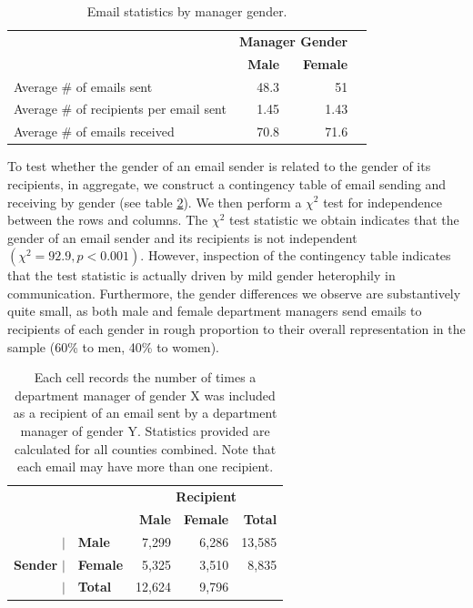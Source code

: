 \documentclass{pnastwo}
\begin{document}
\begin{article}
	\setlength{\tabcolsep}{2pt}
	\begin{table}
	\centering
		\begin{tabular}{m{2.1in}rrr}
		\toprule
		& \multicolumn{2}{c}{\textbf{Manager Gender}} \\
		\cmidrule{2-3}
	& \textbf{Male} & \textbf{Female}  \\
		 \midrule
		 Average \# of emails sent & 48.3 & 51 \\
		 Average \# of recipients per email sent & 1.45 & 1.43 \\
		 \midrule
		 Average \# of emails received & 70.8 & 71.6 \\
		\bottomrule
		\end{tabular}
		\caption{\label{tab:email agg stats}Email statistics by manager
gender.\\}
	\end{table}
	\setlength{\tabcolsep}{6pt}

To test whether the gender of an email sender is related to the gender of its recipients, in aggregate, we construct a contingency table of email sending and receiving by gender (see table \ref{tab:gender email agg stats}). We then perform a $\chi^2$ test for independence between the rows and columns. The $\chi^2$ test statistic we obtain indicates that the gender of an email sender and its recipients is not independent $(\chi^2 = 92.9, p < 0.001)$. However, inspection of the contingency table indicates that the test statistic is actually driven by mild gender heterophily in communication. Furthermore, the gender differences we observe are substantively quite small, as both male and female department managers send emails to recipients of each gender in rough proportion to their overall representation in the sample (60\% to men, 40\% to women).  
	
	\begin{table}
	\centering
		\begin{tabular}{rlrr|r}
		\toprule
		 && \multicolumn{3}{c}{\textbf{Recipient}} \\
		\cmidrule{3-5}
	& & \textbf{Male} & \textbf{Female} & \textbf{Total}  \\
		 \midrule
		$|$& \textbf{Male} & 7,299 & 6,286 & 13,585 \\
	\textbf{Sender}	$|$& \textbf{Female} & 5,325 & 3,510 & 8,835 \\
	\cmidrule{2-5}
		 $|$& \textbf{Total} & 12,624 & 9,796 & \\
		\bottomrule
		\end{tabular}
		\caption{\label{tab:gender email agg stats}Each cell records the number of times a department manager of gender X was included as a recipient of an email sent by a department manager of gender Y. Statistics provided are calculated for all counties combined. Note that each email may have more than one recipient.}
	\end{table}
	

\end{article}
\end{document}
